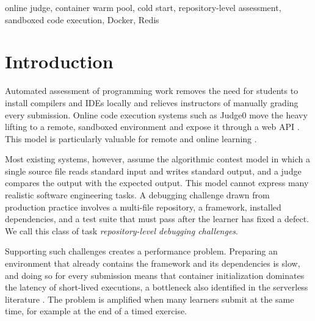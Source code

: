 \documentclass[conference]{IEEEtran}
\begin{document}
\begin{IEEEkeywords}
online judge, container warm pool, cold start, repository-level assessment, sandboxed code execution, Docker, Redis
\end{IEEEkeywords}

\section{Introduction}
Automated assessment of programming work removes the need for students to install compilers and IDEs locally and relieves instructors of manually grading every submission. Online code execution systems such as Judge0 move the heavy lifting to a remote, sandboxed environment and expose it through a web API \cite{dosilovic2020}. This model is particularly valuable for remote and online learning \cite{kim2022}.

Most existing systems, however, assume the algorithmic contest model in which a single source file reads standard input and writes standard output, and a judge compares the output with the expected output. This model cannot express many realistic software engineering tasks. A debugging challenge drawn from production practice involves a multi-file repository, a framework, installed dependencies, and a test suite that must pass after the learner has fixed a defect. We call this class of task \emph{repository-level debugging challenges}.

Supporting such challenges creates a performance problem. Preparing an environment that already contains the framework and its dependencies is slow, and doing so for every submission means that container initialization dominates the latency of short-lived executions, a bottleneck also identified in the serverless literature \cite{suo2021}. The problem is amplified when many learners submit at the same time, for example at the end of a timed exercise.
\end{document}

